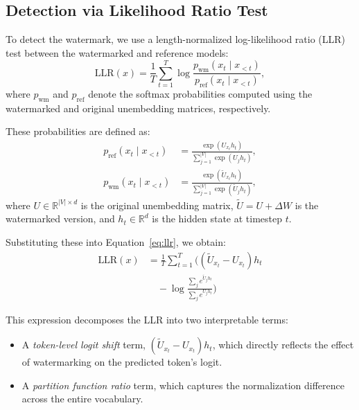 \subsection{Detection via Likelihood Ratio Test}

To detect the watermark, we use a length-normalized log-likelihood ratio (LLR) test between the watermarked and reference models:
\begin{equation} \label{eq:llr}
    \text{LLR}(x) = \frac{1}{T} \sum_{t=1}^{T} \log \frac{p_{\text{wm}}(x_t \mid x_{<t})}{p_{\text{ref}}(x_t \mid x_{<t})},
\end{equation}
where \( p_{\text{wm}} \) and \( p_{\text{ref}} \) denote the softmax probabilities computed using the watermarked and original unembedding matrices, respectively.

These probabilities are defined as:
\begin{align}
    p_{\text{ref}}(x_t \mid x_{<t}) & =
    \frac{\exp(U_{x_t} h_t)}{\sum_{j=1}^{|V|} \exp(U_j h_t)}, \\
    p_{\text{wm}}(x_t \mid x_{<t})  & =
    \frac{\exp(\tilde{U}_{x_t} h_t)}{\sum_{j=1}^{|V|} \exp(\tilde{U}_j h_t)},
\end{align}
where \( U \in \mathbb{R}^{|V| \times d} \) is the original unembedding matrix, \( \tilde{U} = U + \Delta W \) is the watermarked version, and \( h_t \in \mathbb{R}^d \) is the hidden state at timestep \( t \).

Substituting these into Equation~\ref{eq:llr}, we obtain:
\begin{equation}
    \begin{aligned}
        \text{LLR}(x)
         & = \frac{1}{T} \sum_{t=1}^{T} \Big(
        (\tilde{U}_{x_t} - U_{x_t}) h_t                                       \\
         & \quad - \log \frac{\sum_j e^{\tilde{U}_j h_t}}{\sum_j e^{U_j h_t}}
        \Big)
    \end{aligned}
\end{equation}

This expression decomposes the LLR into two interpretable terms:
\begin{itemize}
    \item A \textit{token-level logit shift} term, \( (\tilde{U}_{x_t} - U_{x_t}) h_t \), which directly reflects the effect of watermarking on the predicted token's logit.
    \item A \textit{partition function ratio} term, which captures the normalization difference across the entire vocabulary.
\end{itemize}


